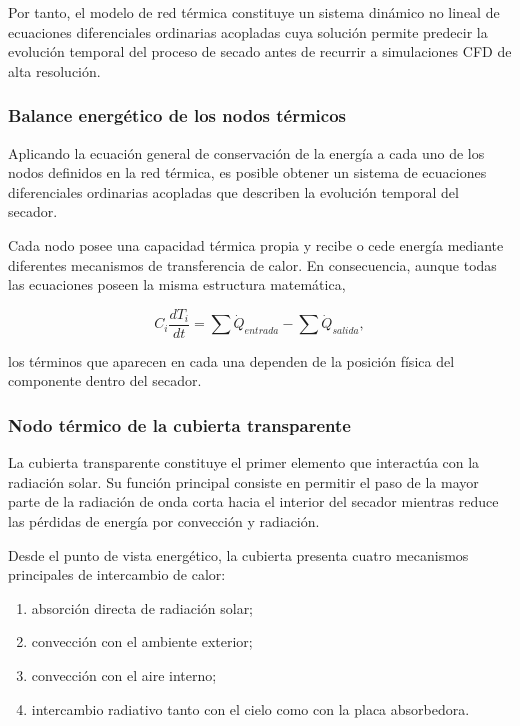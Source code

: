 Por tanto, el modelo de red térmica constituye un sistema dinámico no lineal de ecuaciones diferenciales ordinarias acopladas cuya solución permite predecir la evolución temporal del proceso de secado antes de recurrir a simulaciones CFD de alta resolución.


\subsubsection{Balance energético de los nodos térmicos}

Aplicando la ecuación general de conservación de la energía a cada uno de los nodos definidos en la red térmica, es posible obtener un sistema de ecuaciones diferenciales ordinarias acopladas que describen la evolución temporal del secador.

Cada nodo posee una capacidad térmica propia y recibe o cede energía mediante diferentes mecanismos de transferencia de calor. En consecuencia, aunque todas las ecuaciones poseen la misma estructura matemática,

\[
C_i\frac{dT_i}{dt}
=
\sum \dot Q_{entrada}
-
\sum \dot Q_{salida},
\]

los términos que aparecen en cada una dependen de la posición física del componente dentro del secador.

\subsubsection{Nodo térmico de la cubierta transparente}

La cubierta transparente constituye el primer elemento que interactúa con la radiación solar. Su función principal consiste en permitir el paso de la mayor parte de la radiación de onda corta hacia el interior del secador mientras reduce las pérdidas de energía por convección y radiación.

Desde el punto de vista energético, la cubierta presenta cuatro mecanismos principales de intercambio de calor:

\begin{enumerate}

\item absorción directa de radiación solar;

\item convección con el ambiente exterior;

\item convección con el aire interno;

\item intercambio radiativo tanto con el cielo como con la placa absorbedora.

\end{enumerate}

